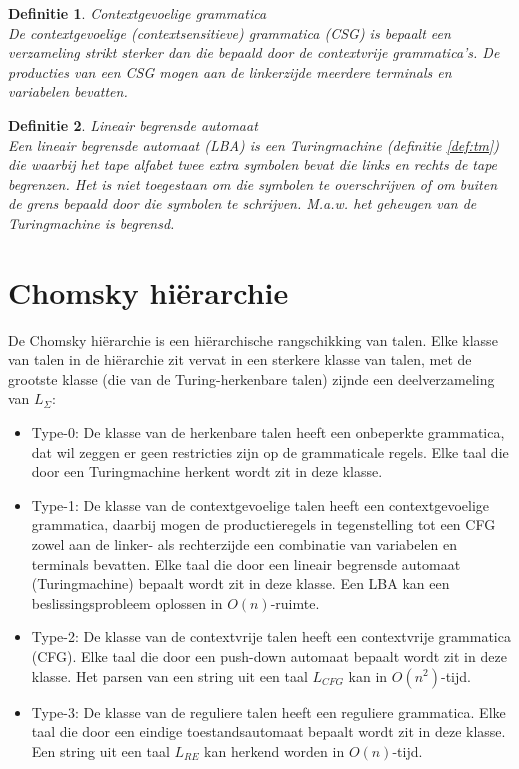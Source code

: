\documentclass[a4paper]{article}
\newtheorem{tdefinitie}{Definitie}[section]
\newenvironment{definitie}[1]%
  {\begin{mdframed}[backgroundcolor=silver,
    topline=false,
    rightline=false,
    leftline=false,
    bottomline=false]\begin{tdefinitie}#1\\\normalfont}%
  {\end{tdefinitie}\end{mdframed}}
\begin{document}
\begin{definitie}{Contextgevoelige grammatica}
  De contextgevoelige (contextsensitieve) grammatica (CSG) is bepaalt een verzameling strikt sterker dan die bepaald door de contextvrije grammatica's. De producties van een CSG mogen aan de linkerzijde meerdere terminals en variabelen bevatten.
\end{definitie}

\begin{definitie}{Lineair begrensde automaat}
  Een lineair begrensde automaat (LBA) is een Turingmachine (definitie \ref{def:tm}) die waarbij het tape alfabet twee extra symbolen bevat die links en rechts de tape begrenzen. Het is niet toegestaan om die symbolen te overschrijven of om buiten de grens bepaald door die symbolen te schrijven. M.a.w. het geheugen van de Turingmachine is begrensd.
\end{definitie}

\newpage\section{Chomsky hi\"erarchie}

De Chomsky hi\"erarchie is een hi\"erarchische rangschikking van talen. Elke klasse van talen in de hi\"erarchie zit vervat in een sterkere klasse van talen, met de grootste klasse (die van de Turing-herkenbare talen) zijnde een deelverzameling van $L_\Sigma$:
\begin{itemize}
\item Type-0: De klasse van de herkenbare talen heeft een onbeperkte grammatica, dat wil zeggen er geen restricties zijn op de grammaticale regels. Elke taal die door een Turingmachine herkent wordt zit in deze klasse.
\item Type-1: De klasse van de contextgevoelige talen heeft een contextgevoelige grammatica, daarbij mogen de productieregels in tegenstelling tot een CFG zowel aan de linker- als rechterzijde een combinatie van variabelen en terminals bevatten. Elke taal die door een lineair begrensde automaat (Turingmachine) bepaalt wordt zit in deze klasse. Een LBA kan een beslissingsprobleem oplossen in $O(n)$-ruimte.
\item Type-2: De klasse van de contextvrije talen heeft een contextvrije grammatica (CFG). Elke taal die door een push-down automaat bepaalt wordt zit in deze klasse. Het parsen van een string uit een taal $L_{CFG}$ kan in $O(n^2)$-tijd.
\item Type-3: De klasse van de reguliere talen heeft een reguliere grammatica. Elke taal die door een eindige toestandsautomaat bepaalt wordt zit in deze klasse. Een string uit een taal $L_{RE}$ kan herkend worden in $O(n)$-tijd.
\end{itemize}
\end{document}

